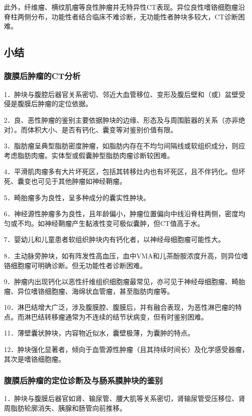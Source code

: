 此外，纤维瘤、横纹肌瘤等良性肿瘤并无特异性CT表现。异位良性嗜铬细胞瘤沿脊柱两侧分布，功能性者结合临床不难诊断，无功能性者肿块多较大，CT诊断困难。

\subsection{小结}

\subsubsection{腹膜后肿瘤的CT分析}

1．肿块与腹腔后器官关系密切、邻近大血管移位、变形及腹后壁和（或）盆壁受侵是腹膜后肿瘤的定位依据。

2．良、恶性肿瘤的鉴别主要依据肿块的边缘、形态及与周围脏器的关系（亦非绝对）。而体积大小、是否有钙化、囊变等对鉴别价值有限。

3．脂肪瘤呈典型脂肪密度肿瘤，如脂肪内存在不均匀间隔线或软组织成分，则应考虑脂肪肉瘤。实体型或假囊肿型脂肪肉瘤诊断较困难。

4．平滑肌肉瘤多有大片坏死区，包括其转移灶内也有坏死区，且不伴钙化。但坏死、囊变也可见于其他肿瘤如神经鞘瘤。

5．畸胎瘤多为良性，呈多种成分的囊实性肿块。

6．神经源性肿瘤多为良性，且年龄偏小，肿瘤位置偏向中线沿脊柱两侧，密度均匀或不均。如神经鞘瘤产生黏液性变可极似囊肿，但CT值高于水。

7．婴幼儿和儿童患者软组织肿块内有钙化者，以神经母细胞瘤可能性大。

8．主动脉旁肿块，如有阵发性高血压，血中VMA和儿茶酚胺浓度升高，则异位嗜铬细胞瘤可明确诊断。但无功能性者诊断困难。

9．肿瘤内出现钙化以恶性纤维组织细胞瘤最常见，亦可见于神经母细胞瘤、畸胎瘤、异位嗜铬细胞瘤、海绵状血管瘤，甚至脂肪肉瘤等。

10．淋巴结增大广泛，涉及腹膜腔、腹膜后，并有融合表现，为恶性淋巴瘤的特点。而淋巴结转移瘤通常为不连续的结节状病变，但有时鉴别困难。

11．薄壁囊状肿块，内容物近似水，囊壁极薄，为囊肿的特点。

12．肿块强化显著者，倾向于血管源性肿瘤（且其持续时间长）及化学感受器瘤，其次是嗜铬细胞瘤。

\subsubsection{腹膜后肿瘤的定位诊断及与肠系膜肿块的鉴别}

1．肿块与腹膜后器官如肾、输尿管、腰大肌等关系密切，肾输尿管受压移位、肾周脂肪轮廓消失、胰腺和肠管向前推移。

